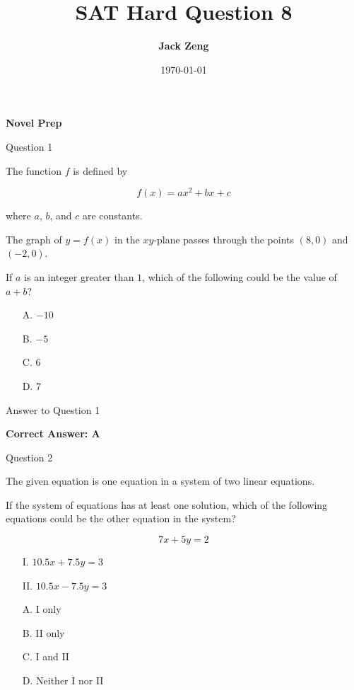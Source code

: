 \documentclass{beamer}
\title[SAT Hard Question]{\textbf{SAT Hard Question 8}}
\author{\textbf{Jack Zeng}}
\institute{\textcolor{white}{\textbf{Novel Prep}}}
\date{\today}
\begin{document}
\begin{frame}
    \titlepage
    \vfill
    \begin{flushright}
        \textcolor{purpleblue}{\Huge \textbf{Novel Prep}}
    \end{flushright}
\end{frame}


\begin{frame}{Question 1}

The function $f$ is defined by

\[
f(x)=ax^2+bx+c
\]

where $a$, $b$, and $c$ are constants.

The graph of $y=f(x)$ in the $xy$-plane passes through the points $(8,0)$ and $(-2,0)$.

If $a$ is an integer greater than $1$, which of the following could be the value of $a+b$?

\begin{itemize}
    \item[A.] $-10$
    \item[B.] $-5$
    \item[C.] $6$
    \item[D.] $7$
\end{itemize}

\end{frame}

\begin{frame}{Answer to Question 1}

\textbf{Correct Answer: A}

\end{frame}


\begin{frame}{Question 2}

The given equation is one equation in a system of two linear equations.

If the system of equations has at least one solution, which of the following equations could be the other equation in the system?

\[
7x+5y=2
\]

\begin{itemize}
    \item[I.] $10.5x+7.5y=3$
    \item[II.] $10.5x-7.5y=3$
\end{itemize}

\begin{itemize}
    \item[A.] I only
    \item[B.] II only
    \item[C.] I and II
    \item[D.] Neither I nor II
\end{itemize}

\end{frame}
\end{document}
